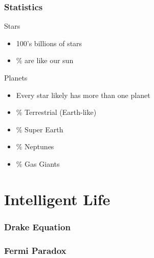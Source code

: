 \documentclass{beamer}
\begin{document}
\begin{frame}
\frametitle{Statistics}
Stars
\begin{itemize}
    \item 100's billions of stars
    \pause
    \item \% are like our sun
\end{itemize}
Planets
\begin{itemize}
    \item Every star likely has more than one planet
    \pause
    \item \% Terrestrial (Earth-like)
    \item \% Super Earth
    \item \% Neptunes
    \item \% Gas Giants
\end{itemize}
\end{frame}

\section{Intelligent Life}
\begin{frame}
\frametitle{Drake Equation}
\end{frame}

\begin{frame}
\frametitle{Fermi Paradox}
\end{frame}
%
\end{document}
